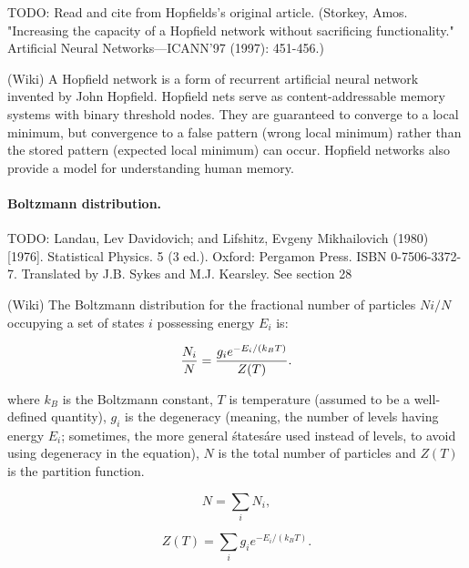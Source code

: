 TODO: Read and cite from Hopfields's original article. (Storkey, Amos. "Increasing the capacity of a Hopfield network without sacrificing functionality." Artificial Neural Networks—ICANN'97 (1997): 451-456.)

(Wiki) A Hopfield network is a form of recurrent artificial neural network invented by John Hopfield. Hopfield nets serve as content-addressable memory systems with binary threshold nodes. They are guaranteed to converge to a local minimum, but convergence to a false pattern (wrong local minimum) rather than the stored pattern (expected local minimum) can occur. Hopfield networks also provide a model for understanding human memory.

\paragraph{Boltzmann distribution.}

TODO:  Landau, Lev Davidovich; and Lifshitz, Evgeny Mikhailovich (1980) [1976]. Statistical Physics. 5 (3 ed.). Oxford: Pergamon Press. ISBN 0-7506-3372-7. Translated by J.B. Sykes and M.J. Kearsley. See section 28

(Wiki) The Boltzmann distribution for the fractional number of particles $Ni / N$ occupying a set of states $i$ possessing energy $E_i$ is:

    $${N_i \over N} = {g_i e^{-E_i/(k_BT)} \over Z(T)}.$$

where $k_B$ is the Boltzmann constant, $T$ is temperature (assumed to be a well-defined quantity), $g_i$ is the degeneracy (meaning, the number of levels having energy $E_i$; sometimes, the more general \'states\' are used instead of levels, to avoid using degeneracy in the equation), $N$ is the total number of particles and $Z(T)$ is the partition function.

    $$N=\sum_i N_i,$$

    $$Z(T)=\sum_i g_i e^{-E_i/(k_BT)}. $$
